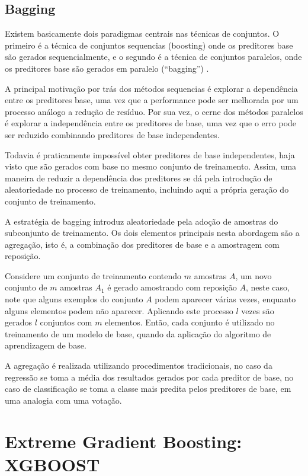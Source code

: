\subsection{Bagging}

Existem basicamente dois paradigmas centrais nas técnicas de conjuntos. O primeiro é a técnica de conjuntos sequencias (boosting) onde os preditores base são gerados sequencialmente, e o segundo é a técnica de conjuntos paralelos, onde os preditores base são gerados em paralelo (``bagging'') \cite{BREIMAN:1996}.

A principal motivação por trás dos métodos sequencias é explorar a dependência entre os preditores base, uma vez que a performance pode ser melhorada por um processo análogo a redução de resíduo. Por sua vez, o cerne dos métodos paralelos é explorar a independência entre os preditores de base, uma vez que o erro pode ser reduzido combinando preditores de base independentes.

Todavia é praticamente impossível obter preditores de base independentes, haja visto que são gerados com base no mesmo conjunto de treinamento. Assim, uma maneira de reduzir a dependência dos preditores se dá pela introdução de aleatoriedade no processo de treinamento, incluindo aqui a própria geração do conjunto de treinamento.

A estratégia de bagging introduz aleatoriedade pela adoção de amostras do subconjunto de treinamento. Os dois elementos principais nesta abordagem são a agregação, isto é, a combinação dos preditores de base e a amostragem com reposição.

Considere um conjunto de treinamento contendo $m$ amostras $A$, um novo conjunto de $m$ amostras $A_1$ é gerado amostrando com reposição $A$, neste caso, note que alguns exemplos do conjunto $A$ podem aparecer várias vezes, enquanto alguns elementos podem não aparecer. Aplicando este processo $l$ vezes são gerados $l$ conjuntos com $m$ elementos. Então, cada conjunto é utilizado no treinamento de um modelo de base, quando da aplicação do algoritmo de aprendizagem de base.

A agregação é realizada utilizando procedimentos tradicionais, no caso da regressão se toma a média dos resultados gerados por cada preditor de base, no caso de classificação se toma a classe mais predita pelos preditores de base, em uma analogia com uma votação.





\section{Extreme Gradient Boosting: XGBOOST}

